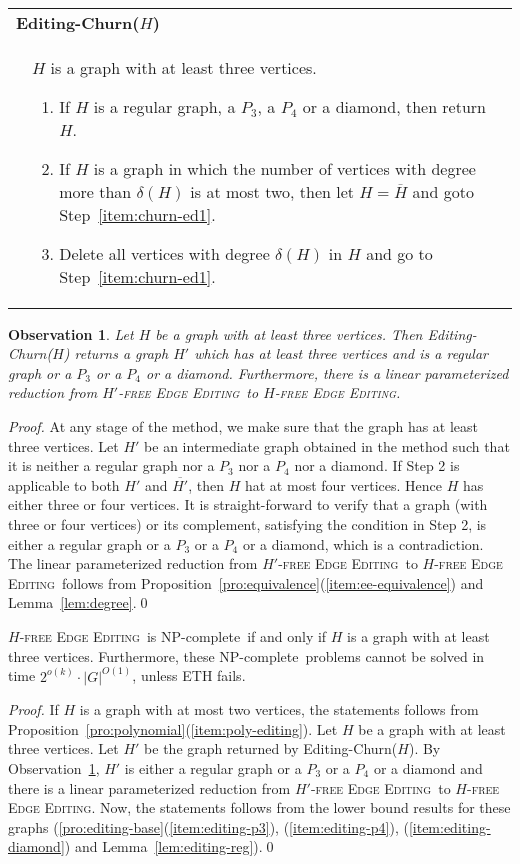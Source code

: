 \documentclass[envcountsame,envcountsect,10pt,oribibl]{llncs}
\newcommand{\pname}[1]{\textnormal{\textsc{#1}}}
\newcommand{\cclass}[1]{\textnormal{\textsf{#1}}}
\newcommand{\HEE}{\pname{$H$-free Edge Editing}}
\newcommand{\HDEE}{\pname{$H'$-free Edge Editing}}
\newcommand{\NPC}{\cclass{NP-complete}}
\newtheorem{observation}[lemma]{Observation}
\newcommand{\defstage}[2]{\hfill\\\smallskip\noindent \begin{tabularx}{\textwidth}{|l X|}\hline \multicolumn{2}{|l|}{\textbf{#1}}\\&#2\\\hline \end{tabularx}}
\begin{document}
\defstage{Editing-Churn($H$)}
{ $H$ is a graph with at least three vertices.
  \begin{enumerate}[Step 1:]
    \item\label{item:churn-ed1} If $H$ is a regular graph, a $P_3$, a $P_4$ or a diamond, then return $H$.
    \item\label{item:churn-ed2} If $H$ is a graph in which the number of vertices with degree more than $\delta(H)$
      is at most two, then let $H=\overline{H}$ and goto Step~\ref{item:churn-ed1}.
    \item\label{item:churn-ed3} Delete all vertices with degree $\delta(H)$ in $H$ and go to Step~\ref{item:churn-ed1}.
  \end{enumerate}
}

\begin{observation}
  \label{obs:editing-churn}
  Let $H$ be a graph with at least three vertices.
  Then Editing-Churn($H$) returns a graph $H'$ which has
  at least three vertices and is a regular graph or a $P_3$ or a $P_4$
  or a diamond. Furthermore, there is a linear parameterized reduction
  from \HDEE\ to \HEE.
\end{observation}
\begin{proof}
  At any stage of the method, we make sure that the graph has at least three vertices. 
  Let $H'$ be an intermediate graph obtained in the method such that it is neither a regular graph
  nor a $P_3$ nor a $P_4$ nor a diamond. If Step 2 is applicable to both $H'$ and $\overline{H'}$,
  then $H$ hat at most four vertices. Hence $H$ has either three or four vertices. 
  It is straight-forward to verify that a graph (with three or four vertices) or its complement,
  satisfying the condition in Step 2,
  is either a regular graph or a $P_3$ or a $P_4$ or a diamond, which is a contradiction.
  The linear parameterized reduction from \HDEE\ to \HEE\ follows from
  Proposition~\ref{pro:equivalence}(\ref{item:ee-equivalence}) and Lemma~\ref{lem:degree}.\qed
\end{proof}

\begin{theorem}
  \label{thm:editing}
  \HEE\ is \NPC\ if and only if $H$ is a graph with 
  at least three vertices. Furthermore, these \NPC\
  problems cannot be solved in time $2^{o(k)}\cdot |G|^{O(1)}$, unless ETH fails.
\end{theorem}
\begin{proof}
  If $H$ is a graph with at most two vertices, 
  the statements follows from Proposition~\ref{pro:polynomial}(\ref{item:poly-editing}).
  Let $H$ be a graph with at least three vertices.
  Let $H'$ be the graph returned by Editing-Churn($H$).
  By Observation~\ref{obs:editing-churn}, $H'$ is either a regular graph or a $P_3$
  or a $P_4$ or a diamond and there is a linear parameterized reduction from
  \HDEE\ to \HEE.
  Now, the statements follows from the lower bound results for these graphs 
  (\ref{pro:editing-base}(\ref{item:editing-p3}), (\ref{item:editing-p4}), (\ref{item:editing-diamond}) and
  Lemma~\ref{lem:editing-reg}).\qed
\end{proof}
\end{document}
